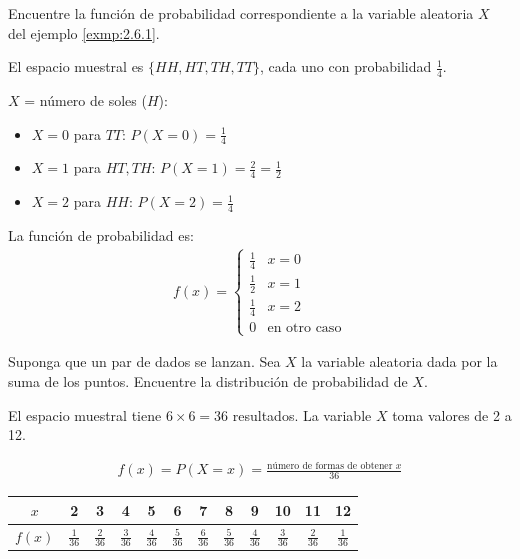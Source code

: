 \begin{ejemplo}
	\label{exmp:2.6.2}
	Encuentre la función de probabilidad correspondiente a la variable aleatoria $X$ del ejemplo \ref{exmp:2.6.1}.
\end{ejemplo}

\begin{solucion}
	El espacio muestral es $\{HH, HT, TH, TT\}$, cada uno con probabilidad $\frac{1}{4}$.
	
	$X$ = número de soles ($H$):
	\begin{itemize}
		\item $X = 0$ para $TT$: $P(X=0) = \frac{1}{4}$
		\item $X = 1$ para $HT, TH$: $P(X=1) = \frac{2}{4} = \frac{1}{2}$
		\item $X = 2$ para $HH$: $P(X=2) = \frac{1}{4}$
	\end{itemize}
	
	La función de probabilidad es:
	\begin{align}
		f(x) = \begin{cases}
			\frac{1}{4} & x = 0 \\
			\frac{1}{2} & x = 1 \\
			\frac{1}{4} & x = 2 \\
			0 & \text{en otro caso}
		\end{cases}
	\end{align}
\end{solucion}



\begin{ejemplo}
	\label{exmp:2.6.3}
	Suponga que un par de dados se lanzan. Sea $X$ la variable aleatoria dada por la suma de los puntos. Encuentre la distribución de probabilidad de $X.$
\end{ejemplo}

\begin{solucion}
	El espacio muestral tiene $6 \times 6 = 36$ resultados. La variable $X$ toma valores de 2 a 12.
	
	\begin{align}
		f(x) = P(X=x) = \frac{\text{número de formas de obtener } x}{36}
	\end{align}
	
	\begin{center}
	\begin{tabular}{c|ccccccccccc}
		$x$ & 2 & 3 & 4 & 5 & 6 & 7 & 8 & 9 & 10 & 11 & 12 \\
		\hline
		$f(x)$ & $\frac{1}{36}$ & $\frac{2}{36}$ & $\frac{3}{36}$ & $\frac{4}{36}$ & $\frac{5}{36}$ & $\frac{6}{36}$ & $\frac{5}{36}$ & $\frac{4}{36}$ & $\frac{3}{36}$ & $\frac{2}{36}$ & $\frac{1}{36}$
	\end{tabular}
	\end{center}
\end{solucion}



